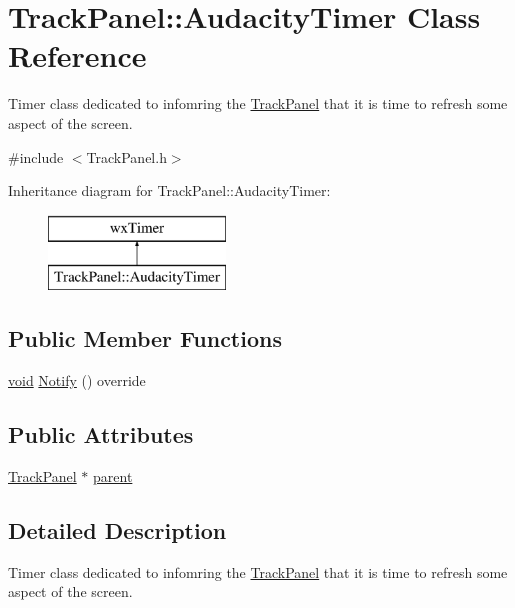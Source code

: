 \hypertarget{class_track_panel_1_1_audacity_timer}{}\section{Track\+Panel\+:\+:Audacity\+Timer Class Reference}
\label{class_track_panel_1_1_audacity_timer}


Timer class dedicated to infomring the \hyperlink{class_track_panel}{Track\+Panel} that it is time to refresh some aspect of the screen.  




{\ttfamily \#include $<$Track\+Panel.\+h$>$}

Inheritance diagram for Track\+Panel\+:\+:Audacity\+Timer\+:\begin{figure}[H]
\begin{center}
\leavevmode
\includegraphics[height=2.000000cm]{class_track_panel_1_1_audacity_timer}
\end{center}
\end{figure}
\subsection*{Public Member Functions}
\begin{DoxyCompactItemize}
\item 
\hyperlink{sound_8c_ae35f5844602719cf66324f4de2a658b3}{void} \hyperlink{class_track_panel_1_1_audacity_timer_a2a4239bed38d1133fb752b8d12906f3e}{Notify} () override
\end{DoxyCompactItemize}
\subsection*{Public Attributes}
\begin{DoxyCompactItemize}
\item 
\hyperlink{class_track_panel}{Track\+Panel} $\ast$ \hyperlink{class_track_panel_1_1_audacity_timer_a27a92324083fac464bbf0612bfbed543}{parent}
\end{DoxyCompactItemize}


\subsection{Detailed Description}
Timer class dedicated to infomring the \hyperlink{class_track_panel}{Track\+Panel} that it is time to refresh some aspect of the screen. 

